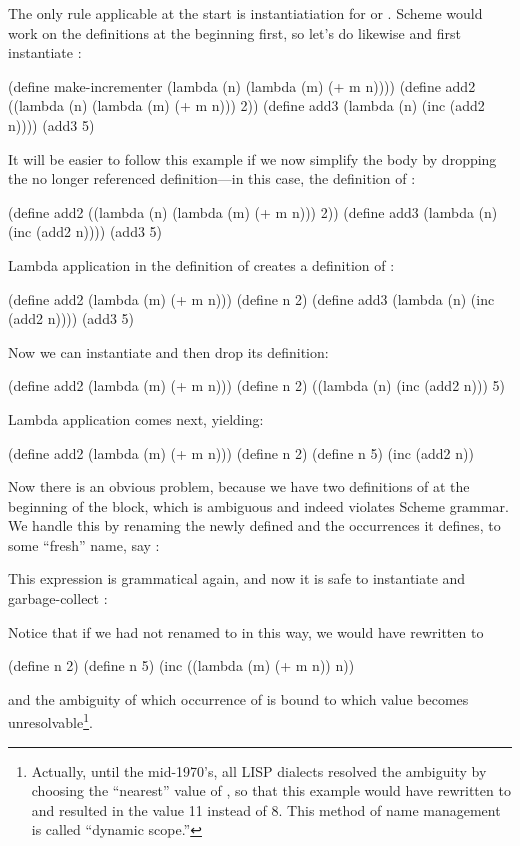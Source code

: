 \documentclass[11pt]{article}
\begin{document}
The only rule applicable at the start is instantiatiation for
 or .  Scheme would work on the
definitions at the beginning first, so let's do likewise and first
instantiate :
\begin{lisp}
(define make-incrementer (lambda (n) (lambda (m) (+ m n))))
(define add2 ((lambda (n) (lambda (m) (+ m n))) 2))
(define add3 (lambda (n) (inc (add2 n))))
(add3 5)
\end{lisp}
It will be easier to follow this example if we now simplify the body by
dropping the no longer referenced definition---in this case, the
definition of :
\begin{lisp}
(define add2 ((lambda (n) (lambda (m) (+ m n))) 2))
(define add3 (lambda (n) (inc (add2 n))))
(add3 5)
\end{lisp}
Lambda application in the definition of  creates a definition
of :
\begin{lisp}
(define add2 (lambda (m) (+ m n)))
(define n 2)
(define add3 (lambda (n) (inc (add2 n))))
(add3 5)
\end{lisp}
Now we can instantiate  and then drop its definition:
\begin{lisp}
(define add2 (lambda (m) (+ m n)))
(define n 2)
((lambda (n) (inc (add2 n))) 5)
\end{lisp}
Lambda application comes next, yielding:
\begin{lisp}
(define add2 (lambda (m) (+ m n)))
(define n 2)
(define n 5)
(inc (add2 n))
\end{lisp}

Now there is an obvious problem, because we have two definitions of
 at the beginning of the block, which is ambiguous and indeed
violates Scheme grammar.  We handle this by renaming the newly defined
 and the occurrences it defines, to some ``fresh'' name, say
:
This expression is grammatical again, and now it is safe to instantiate
and garbage-collect :

Notice that if we had not renamed  to  in this way, we
would have rewritten to
\begin{lisp}
(define n 2)
(define n 5)
(inc ((lambda (m) (+ m n)) n))
\end{lisp}
and the ambiguity of which occurrence of  is bound to which value
becomes unresolvable\footnote{Actually, until the mid-1970's, all LISP
dialects resolved the ambiguity by choosing the ``nearest'' value of
, so that this example would have rewritten to  and resulted in the value 11 instead of 8.  This method
of name management is called ``dynamic scope.''}.
\end{document}
